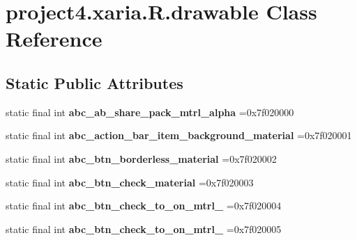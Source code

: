\hypertarget{classproject4_1_1xaria_1_1R_1_1drawable}{}\section{project4.\+xaria.\+R.\+drawable Class Reference}
\label{classproject4_1_1xaria_1_1R_1_1drawable}
\subsection*{Static Public Attributes}
\begin{DoxyCompactItemize}
\item 
\mbox{\label{classproject4_1_1xaria_1_1R_1_1drawable_a32e2483176738826a3aa0e49f4cf2386}} 
static final int {\bfseries abc\+\_\+ab\+\_\+share\+\_\+pack\+\_\+mtrl\+\_\+alpha} =0x7f020000
\item 
\mbox{\label{classproject4_1_1xaria_1_1R_1_1drawable_aae9589b0cf36f4ca25727ee4abff5cbc}} 
static final int {\bfseries abc\+\_\+action\+\_\+bar\+\_\+item\+\_\+background\+\_\+material} =0x7f020001
\item 
\mbox{\label{classproject4_1_1xaria_1_1R_1_1drawable_a1fe8b830d7fab837b6872a2b304d1af9}} 
static final int {\bfseries abc\+\_\+btn\+\_\+borderless\+\_\+material} =0x7f020002
\item 
\mbox{\label{classproject4_1_1xaria_1_1R_1_1drawable_ad78b288cbe47d5b0b3cdc4226aa53959}} 
static final int {\bfseries abc\+\_\+btn\+\_\+check\+\_\+material} =0x7f020003
\item 
\mbox{\label{classproject4_1_1xaria_1_1R_1_1drawable_add00910013c9e372cbf34dfd162f7474}} 
static final int {\bfseries abc\+\_\+btn\+\_\+check\+\_\+to\+\_\+on\+\_\+mtrl\+\_} =0x7f020004
\item 
\mbox{\label{classproject4_1_1xaria_1_1R_1_1drawable_ae690615fbd6bb6a6bc21d333ccc11579}} 
static final int {\bfseries abc\+\_\+btn\+\_\+check\+\_\+to\+\_\+on\+\_\+mtrl\+\_} =0x7f020005
\item 

\end{DoxyCompactItemize}
